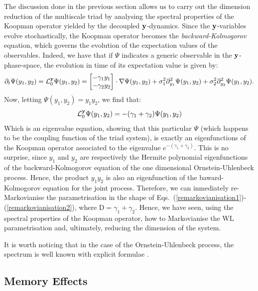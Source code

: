 \documentclass[12pt]{article}
\begin{document}
The discussion done in the previous section allows us to carry out the dimension reduction of the multiscale triad by analysing the spectral properties of the Koopman operator yielded by the decoupled $\mathbf{y}$-dynamics. Since the $\mathbf{y}$-variables evolve stochastically, the Koopman operator becomes the \emph{backward-Kolmogorov} equation, which governs the evolution of the expectation values of the observables. Indeed, we have that if $\Psi$ indicates a generic observable in the $\mathbf{y}$-phase-space, the evolution in time of its expectation value is given by:
\begin{equation}
	\partial _t \Psi (y_1,y_2)= \mathcal{L}_0^{\mathbf{y}}\Psi(y_1,y_2) = \begin{bmatrix}
	-\gamma_1 y_1 \\ -\gamma_2y_2
	\end{bmatrix}\cdot \nabla \Psi (y_1,y_2) + \sigma^2_1\partial^2_{y_1}\Psi(y_1,y_2) + \sigma^2_2\partial^2_{y_2}\Psi(y_1,y_2).
\end{equation}
Now, letting $\Psi(y_1,y_2)=y_1y_2$, we find that:
\begin{equation}
	\mathcal{L}^{\mathbf{y}}_{0}\Psi(y_1,y_2) = -(\gamma_1 + \gamma_2)\Psi(y_1,y_2)
\end{equation}
Which is an eigenvalue equation, showing that this particular $\Psi$ (which happens to be the coupling function of the triad system), is exactly an eigenfunctions of the Koopman operator associated to the eigenvalue $e^{-(\gamma_1 + \gamma_2)}$. This is no surprise, since $y_1$ and $y_2$ are respectively the Hermite polynomial eigenfunctions of the backward-Kolmogorov equation of the one dimensional Ornstein-Uhlenbeck process. Hence, the product $y_1y_2$ is also an eigenfunction of the baward-Kolmogorov equation for the joint process. Therefore, we can inmediately re-Markovianise the parametrisation in the shape of Eqs.~(\ref{remarkovianisation1})-(\ref{remarkovianisation2}), where $\mathrm{D}=\gamma_1 + \gamma_2$. Hence, we have seen, using the spectral properties of the Koopman operator, how to Markovianise the WL parametrisation and, ultimately, reducing the dimension of the system.

It is worth noticing that in the case of the Ornstein-Uhlenbeck process, the spectrum is well known with explicit formulae \cite{metafunes2002, pavliotisbook2014}.


\subsection{Memory Effects}\label{memory effects subsection}
\end{document}
